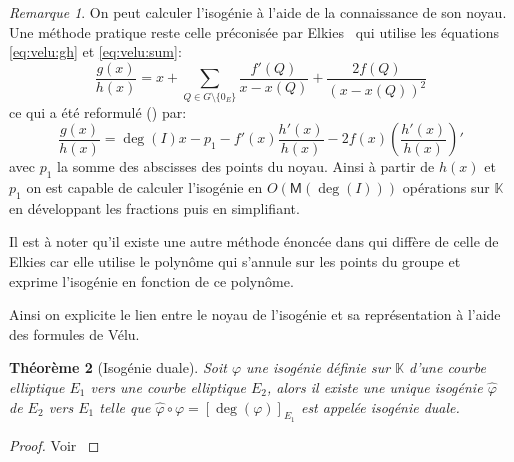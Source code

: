 \documentclass[10pt,a4paper]{book}
\theoremstyle{plain}
\newtheorem{thm}{Théorème}[chapter]
\theoremstyle{definition}
\theoremstyle{definition}
\theoremstyle{definition}
\theoremstyle{definition}
\theoremstyle{definition}
\theoremstyle{remark}
\newtheorem{rem}[thm]{Remarque}
\theoremstyle{remark}
\theoremstyle{definition}
\begin{document}
\begin{rem}
On peut calculer l'isogénie à l'aide de la connaissance de son noyau. Une 
méthode pratique reste celle préconisée par Elkies~\cite{Elkies1998} qui 
utilise les équations \eqref{eq:velu:gh} et \eqref{eq:velu:sum}:
\begin{equation*}
\frac{g(x)}{h(x)}= x + \sum_{Q \in G \setminus \{0_E\}} \frac{f'(Q)}{x-x(Q)}+\frac{2f(Q)}{(x-x(Q))^2}
\end{equation*}
ce qui a été reformulé (\cite[Proposition 4.1]{BMSS08}) par:
\begin{equation}
\frac{g(x)}{h(x)}= \deg(I) x -p_1 - f'(x) \frac{h'(x)}{h(x)} -2f(x)  \left(\frac{h'(x)}{h(x)}\right)'
\end{equation}
avec $p_1$ la somme des abscisses des points du noyau. Ainsi à partir de $h(x)$
et $p_1$ on est capable de calculer l'isogénie en 
$O(\mathsf{M}(\deg(I)))$ opérations sur $\mathbb{K}$ en développant les 
fractions puis en simplifiant.


Il est à noter qu'il existe une autre méthode énoncée dans 
\cite[Section 2.4]{Kohel96} qui diffère de celle de Elkies car elle utilise le 
polynôme qui s'annule sur les points du groupe et exprime l'isogénie en 
fonction de ce polynôme. 
\end{rem}

Ainsi on explicite le lien entre le noyau de l'isogénie et sa 
représentation à l'aide des formules de Vélu.

\begin{thm}[Isogénie duale]
Soit $\varphi$ une isogénie définie sur $\mathbb{K}$ d'une courbe elliptique 
$E_1$ vers une courbe elliptique $E_2$, alors il existe une unique isogénie 
$\widehat{\varphi}$ de $E_2$ vers $E_1$ telle que $\widehat{\varphi}\circ
\varphi=[\deg(\varphi)]_{E_1}$ est appelée \emph{isogénie duale}.
\end{thm}

\begin{proof}
Voir \cite[III.6.1]{Silv1}
\end{proof}
\end{document}
